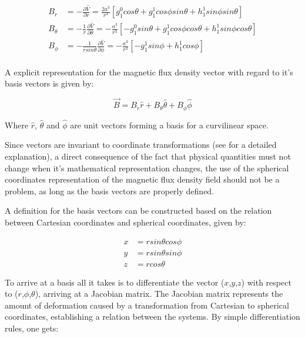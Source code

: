 \begin{align*}
	B_{r} &= -\frac{\partial \hat{V}}{\partial r} = \frac{2a^3}{r^3}\left[ g_{1}^0cos\theta + g_{1}^{1}cos \phi sin \theta + h_{1}^1 sin \phi sin \theta \right]   \\	
	B_{\theta} &= -\frac{1}{r}\frac{\partial \hat{V}}{\partial \theta} = -\frac{a^3}{r^3}\left[ -g_{1}^0sin\theta + g_{1}^{1}cos \phi cos \theta + h_{1}^1 sin \phi cos \theta \right]   \\
	B_{\phi} &= -\frac{1}{r sin \theta}\frac{\partial \hat{V}}{\partial \phi} = -\frac{a^3}{r^3  }\left[ -g_{1}^{1}sin \phi  + h_{1}^1 cos \phi  \right]   \\
\end{align*}

\indent
A explicit representation for the magnetic flux density vector with regard to it's basis vectors is given by:

\begin{equation}
	\vec{B} = B_{r}\hat{r} + B_{\theta}\hat{\theta} + B_{\phi}\hat{\phi}
\end{equation}

\indent
Where $\hat{r}$, $\hat{\theta}$ and $\hat{\phi}$ are unit vectors forming a basis for a curvilinear space. 

\indent
Since vectors are invariant to coordinate transformations (see \cite{AH} for a detailed explanation), a direct consequence of the fact that physical quantities must not change when it's mathematical representation changes, the use of the spherical coordinates representation of the magnetic flux density field should not be a problem, as long as the basis vectors are properly defined.

\indent
A definition for the basis vectors can be constructed based on the relation between Cartesian coordinates and spherical coordinates, given by:

\begin{align*}
	x &= r sin \theta cos \phi \\
	y &= r sin \theta sin \phi \\
	z &= r cos \theta
\end{align*}
 
\indent
To arrive at a basis all it takes is to differentiate the vector ($x$,$y$,$z$) with respect to ($r$,$\phi$,$\theta$), arriving at a Jacobian matrix. The Jacobian matrix represents the amount of deformation caused by a transformation from Cartesian to spherical coordinates, establishing a relation between the systems. By simple differentiation rules, one gets:

